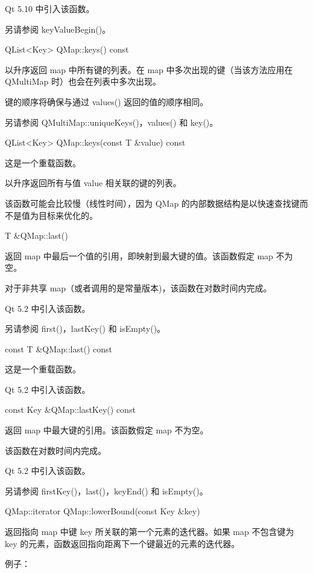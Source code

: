 Qt 5.10 中引入该函数。

另请参阅 keyValueBegin()。

\splitLine

QList<Key> QMap::keys() const

以升序返回 map 中所有键的列表。在 map 中多次出现的键（当该方法应用在 QMultiMap 时）也会在列表中多次出现。

键的顺序将确保与通过 values() 返回的值的顺序相同。

另请参阅 QMultiMap::uniqueKeys()，values() 和 key()。

\splitLine

QList<Key> QMap::keys(const T \&value) const

这是一个重载函数。

以升序返回所有与值 value 相关联的键的列表。

该函数可能会比较慢（线性时间），因为 QMap 的内部数据结构是以快速查找键而不是值为目标来优化的。

\splitLine

T \&QMap::last()

返回 map 中最后一个值的引用，即映射到最大键的值。该函数假定 map 不为空。

对于非共享 map（或者调用的是常量版本)，该函数在对数时间内完成。

Qt 5.2 中引入该函数。

另请参阅 first()，lastKey() 和 isEmpty()。

\splitLine

const T \&QMap::last() const

这是一个重载函数。

Qt 5.2 中引入该函数。

\splitLine

const Key \&QMap::lastKey() const

返回 map 中最大键的引用。该函数假定 map 不为空。

该函数在对数时间内完成。

Qt 5.2 中引入该函数。

另请参阅 firstKey()，last()，keyEnd() 和 isEmpty()。

\splitLine

QMap::iterator QMap::lowerBound(const Key \&key)

返回指向 map 中键 key 所关联的第一个元素的迭代器。如果 map 不包含键为 key 的元素，函数返回指向距离下一个键最近的元素的迭代器。

例子：